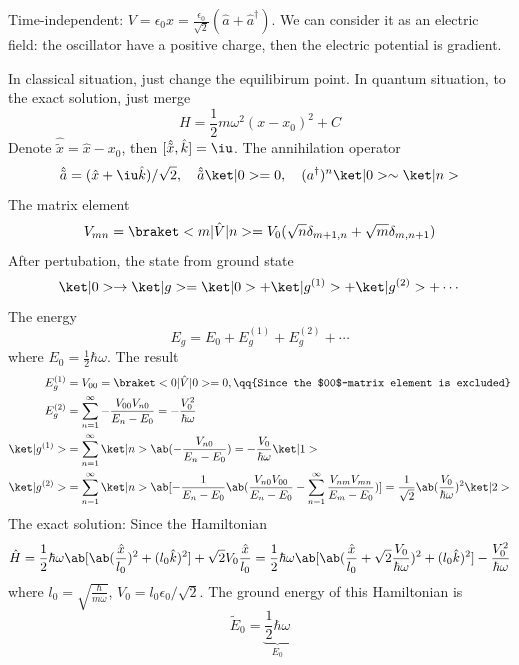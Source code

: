 \begin{solution}[By Li Jian]\leavevmode
  \begin{enumext}
    \item Time-independent:
    $V = \epsilon_0 \hat x
       = \frac{\epsilon_0}{\sqrt2}(\hat a + \hat a^\dagger)$.
    We can consider it as an electric field: the oscillator have a positive
    charge, then the electric potential is gradient.

    In classical situation, just change the equilibirum point.
    In quantum situation, to the exact solution, just merge
    \[
      H = \frac12 m\omega^2 (x - x_0)^2 + C
    \]
    Denote $\hat{\tilde x} = \hat x - x_0$,
    then $[\hat{\tilde x}, \hat k] = \iu$. The annihilation operator
    \[
      \hat{\tilde a} = (\hat x + \iu \hat k)/\sqrt2, \quad
      \hat{\tilde a} \ket|0> = 0, \quad (a^\dagger)^n \ket|0> \sim \ket|n>
    \]
    The matrix element
    \[
      V_{mn} = \braket<m|\hat V|n>
    = V_0(\sqrt n\delta_{m+1,n} + \sqrt m\delta_{m,n+1})
    \]
    After pertubation, the state from ground state
    \[
      \ket|0> \to \ket|g> = \ket|0> + \ket|g^{(1)}> + \ket|g^{(2)}> + \cdots
    \]
    The energy
    \[
      E_g = E_0 + E_g^{(1)} + E_g^{(2)} + \cdots
    \]
    where $E_0 = \frac12\hbar\omega$.
    The result
    \begin{align*}
      E_g^{(1)} & = V_{00} = \braket<0|\hat V|0> = 0,
      \qq{Since the $00$-matrix element is excluded}\\
      E_g^{(2)} & = \sum_{n=1}^\infty -\frac{V_{00} V_{n0}}{E_n - E_0}
    = -\frac{V_0^2}{\hbar\omega}\\
      \ket|g^{(1)}> & = \sum_{n=1}^\infty \ket|n> \ab(-\frac{V_{n0}}{E_n - E_0})
  = -\frac{V_0}{\hbar\omega} \ket|1>\\
      \ket|g^{(2)}> & = \sum_{n=1}^\infty \ket|n>
      \ab[-\frac1{E_n - E_0}\ab(\frac{V_{n0}V_{00}}{E_n - E_0}
    - \sum_{n=1}^\infty \frac{V_{nm}V_{mn}}{E_m - E_0})]
    = \frac1{\sqrt2} \ab(\frac{V_0}{\hbar\omega})^2 \ket|2>
    \end{align*}
    The exact solution: Since the Hamiltonian
    \[
      \hat H = \frac12\hbar\omega\ab[\ab(\frac{\hat x}{l_0})^2 + (l_0\hat k)^2]
    + \sqrt2 V_0 \frac{\hat x}{l_0}
    = \frac12\hbar\omega\ab[\ab
      (\frac{\hat x}{l_0} + \sqrt2\frac{V_0}{\hbar\omega})^2 + (l_0\hat k)^2]
    - \frac{V_0^2}{\hbar\omega}
    \]
    where $l_0 = \sqrt{\frac{\hbar}{m\omega}}$, $V_0 = l_0\epsilon_0/\sqrt2$.
    The ground energy of this Hamiltonian is
    \[
      \tilde E_0 = \underbrace{\frac12 \hbar\omega}_{E_0}
\]
\end{enumext}
\end{solution}
